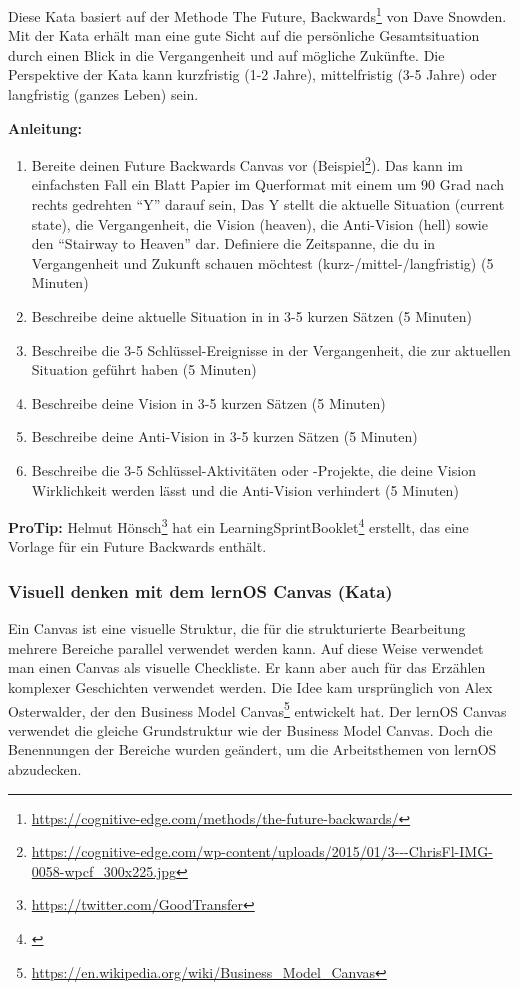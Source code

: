 \documentclass[
  ngerman,
  paper=a4,
,captions=tableheading
]{scrartcl}
\DeclareRobustCommand{\href}[2]{#2\footnote{\url{#1}}}
\providecommand{\tightlist}{%
  \setlength{\itemsep}{0pt}\setlength{\parskip}{0pt}}
\begin{document}
Diese Kata basiert auf der Methode
\href{https://cognitive-edge.com/methods/the-future-backwards/}{The
Future, Backwards} von Dave Snowden. Mit der Kata erhält man eine gute
Sicht auf die persönliche Gesamtsituation durch einen Blick in die
Vergangenheit und auf mögliche Zukünfte. Die Perspektive der Kata kann
kurzfristig (1-2 Jahre), mittelfristig (3-5 Jahre) oder langfristig
(ganzes Leben) sein.

\textbf{Anleitung:}

\begin{enumerate}
\def\labelenumi{\arabic{enumi}.}
\tightlist
\item
  Bereite deinen Future Backwards Canvas vor
  (\href{https://cognitive-edge.com/wp-content/uploads/2015/01/3---ChrisFl-IMG-0058-wpcf_300x225.jpg}{Beispiel}).
  Das kann im einfachsten Fall ein Blatt Papier im Querformat mit einem
  um 90 Grad nach rechts gedrehten ``Y'' darauf sein, Das Y stellt die
  aktuelle Situation (current state), die Vergangenheit, die Vision
  (heaven), die Anti-Vision (hell) sowie den ``Stairway to Heaven'' dar.
  Definiere die Zeitspanne, die du in Vergangenheit und Zukunft schauen
  möchtest (kurz-/mittel-/langfristig) (5 Minuten)
\item
  Beschreibe deine aktuelle Situation in in 3-5 kurzen Sätzen (5
  Minuten)
\item
  Beschreibe die 3-5 Schlüssel-Ereignisse in der Vergangenheit, die zur
  aktuellen Situation geführt haben (5 Minuten)
\item
  Beschreibe deine Vision in 3-5 kurzen Sätzen (5 Minuten)
\item
  Beschreibe deine Anti-Vision in 3-5 kurzen Sätzen (5 Minuten)
\item
  Beschreibe die 3-5 Schlüssel-Aktivitäten oder -Projekte, die deine
  Vision Wirklichkeit werden lässt und die Anti-Vision verhindert (5
  Minuten)
\end{enumerate}

\textbf{ProTip:} \href{https://twitter.com/GoodTransfer}{Helmut Hönsch}
hat ein \href{}{LearningSprintBooklet} erstellt, das eine Vorlage für
ein Future Backwards enthält.

\hypertarget{visuell-denken-mit-dem-lernos-canvas-kata}{%
\subsubsection{Visuell denken mit dem lernOS Canvas
(Kata)}\label{visuell-denken-mit-dem-lernos-canvas-kata}}

Ein Canvas ist eine visuelle Struktur, die für die strukturierte
Bearbeitung mehrere Bereiche parallel verwendet werden kann. Auf diese
Weise verwendet man einen Canvas als visuelle Checkliste. Er kann aber
auch für das Erzählen komplexer Geschichten verwendet werden. Die Idee
kam ursprünglich von Alex Osterwalder, der den
\href{https://en.wikipedia.org/wiki/Business_Model_Canvas}{Business
Model Canvas} entwickelt hat. Der lernOS Canvas verwendet die gleiche
Grundstruktur wie der Business Model Canvas. Doch die Benennungen der
Bereiche wurden geändert, um die Arbeitsthemen von lernOS abzudecken.
\end{document}
